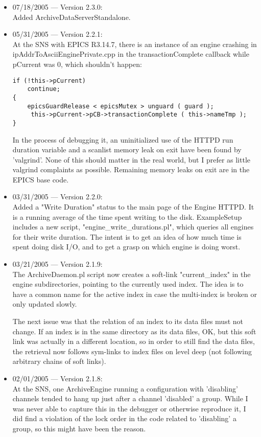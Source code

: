\begin{itemize}
\item 07/18/2005 --- Version 2.3.0:\\
Added ArchiveDataServerStandalone.

\item 05/31/2005 --- Version 2.2.1:\\
At the SNS with EPICS R3.14.7, there is an instance of an engine crashing in
ipAddrToAsciiEnginePrivate.cpp in the transactionComplete callback while
pCurrent was 0, which shouldn't happen:
\begin{verbatim}
if (!this->pCurrent)
    continue;
{
    epicsGuardRelease < epicsMutex > unguard ( guard );
     this->pCurrent->pCB->transactionComplete ( this->nameTmp );
}
\end{verbatim}

In the process of debugging it, an uninitialized use of the HTTPD run duration
variable and a scanlist memory leak on exit have been found by 'valgrind'.
None of this should matter in the real world, but I prefer as little valgrind
complaints as possible. Remaining memory leaks on exit are in the EPICS base
code.

\item 03/31/2005 --- Version 2.2.0:\\
Added a "Write Duration" status to the main
page of the Engine HTTPD.
It is a running average of the time spent
writing to the disk.
ExampleSetup includes a new script,
"engine\_write\_durations.pl",
which queries all engines for their write duration.
The intent is to get an idea of how much time
is spent doing disk I/O, and to get a grasp on
which engine is doing worst.

\item 03/21/2005 --- Version 2.1.9:\\
The ArchiveDaemon.pl script now creates a soft-link
"current\_index" in the engine subdirectories,
pointing to the currently used index.
The idea is to have a common name for the active index
in case the multi-index is broken or only updated
slowly.

The next issue was that the relation of an index
to its data files must not change.
If an index is in the same directory as its data files,
OK, but this soft link was actually in a different location,
so in order to still find the data files, the retrieval
now follows sym-links to index files on level deep
(not following arbitrary chains of soft links).

\item 02/01/2005 --- Version 2.1.8:\\
At the SNS, one ArchiveEngine running a configuration with
'disabling' channels tended to hang up just after a channel
'disabled' a group.
While I was never able to capture this in the debugger or
otherwise reproduce it, I did find a violation of the lock
order in the code related to 'disabling' a group, so this
might have been the reason.


\end{itemize}
